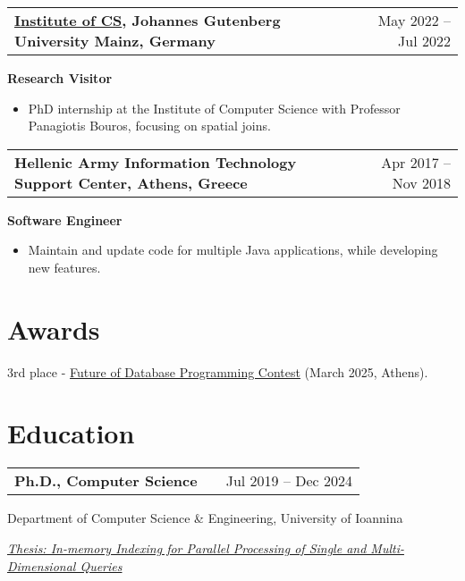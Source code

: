 \documentclass[a4paper,12pt]{article}
\makeatletter
\newenvironment{job}[2]
{
	\begin{tabularx}{\linewidth}{@{}l X r@{}}
		\small
		\textbf{#1} & \hfill &  #2 \\[3.75pt]
	\end{tabularx}
	\begin{minipage}[t]{\linewidth}
		\footnotesize
		\setlength{\parskip}{3pt} %
		\setlength{\parindent}{0pt} %
	}
	{
	\end{minipage}    
}
\makeatother
\begin{document}
\vspace{-2\baselineskip}

\begin{job}{\href{https://www.informatik.uni-mainz.de/en/}{Institute of CS}, Johannes Gutenberg University Mainz, Germany}{May 2022 – Jul 2022}
	\textbf{Research Visitor}
	
	\begin{itemize}
		
		\item PhD internship at the Institute of Computer Science with Professor Panagiotis Bouros, focusing on spatial joins.
	\end{itemize}
	
\end{job}



\begin{job}{Hellenic Army Information Technology Support Center, Athens, Greece}{Apr 2017 – Nov 2018}
\textbf{Software Engineer}
	
	\begin{itemize}
		
		\item Maintain and update code for multiple Java applications, while developing new features.
	\end{itemize}
	
\end{job}


\vspace{-0.75\baselineskip}
\section{Awards}
\small 3rd place - \href{https://databasecontest2024.athenarc.gr/}{Future of Database Programming Contest} (March 2025, Athens).

\newpage
\section{Education}

\begin{job}{Ph.D., Computer Science}{Jul 2019 – Dec 2024}
Department of Computer Science \& Engineering, University of Ioannina

\underline{\textit{Thesis: In-memory Indexing for Parallel Processing of Single and Multi-Dimensional Queries}}
\end{job}
\end{document}
